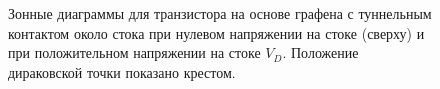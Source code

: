 \documentclass[a4paper,12pt]{article} %
\begin{document}
\begin{figure}[h!]
\caption{ Зонные диаграммы для транзистора на основе графена с туннельным контактом около стока при нулевом напряжении на стоке (сверху) и при положительном напряжении на стоке $V_D$. Положение дираковской точки показано крестом.}
\end{figure}
\end{document}
